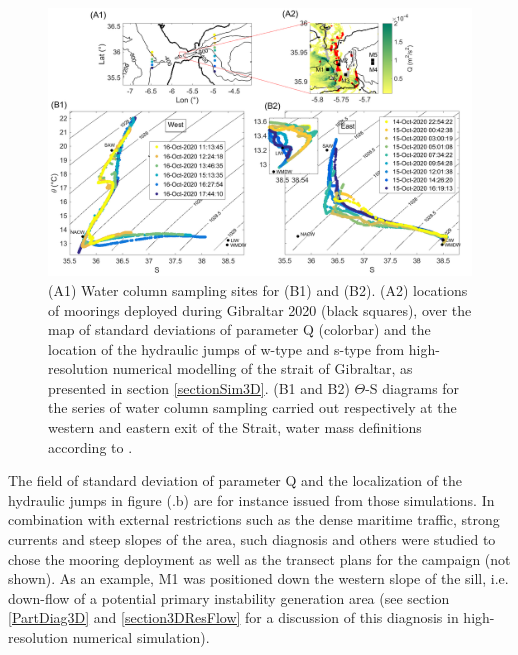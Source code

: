  
\begin{figure}[!h]
 \includegraphics[width=\textwidth]{./GBR3D/Fig_Moor.png}
 \caption [(A)Locations of moorings and water column sampling stations. (B) $\Theta$-S diagrams.]{(A1) Water column sampling sites for (B1) and (B2). (A2) locations of moorings deployed during Gibraltar 2020 (black squares), over the map of standard deviations of parameter Q (colorbar) and the location of the hydraulic jumps of w-type and s-type from high-resolution numerical modelling of the strait of Gibraltar, as presented in section \ref{sectionSim3D}. (B1 and B2) $\Theta$-S diagrams for the series of water column sampling carried out respectively at the western and eastern exit of the Strait, water mass definitions according to \citet{Naranjo2015}.}
 \label{fig_moor}
\end{figure}

The field of standard deviation of parameter Q and the localization of the hydraulic jumps in figure (.b) are for instance issued from those simulations. In combination with external restrictions such as the dense maritime traffic, strong currents and steep slopes of the area, such diagnosis and others were studied to chose the mooring deployment as well as the transect plans for the campaign (not shown). As an example, M1 was positioned down the western slope of the sill, i.e. down-flow of a potential primary instability generation area (see section \ref{PartDiag3D} and \ref{section3DResFlow} for a discussion of this diagnosis in high-resolution numerical simulation).

